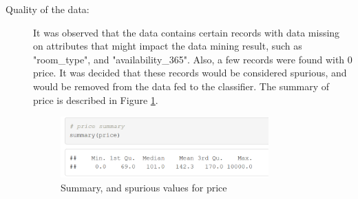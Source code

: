 \documentclass{sig-alternate}
\begin{document}
\begin{description}
\begin{figure}[ht]
		\end{figure}
		\item[Quality of the data:] It was observed that the data contains certain records with data missing on attributes that might impact the data mining result, such as "room\_type", and "availability\_365". Also, a few records were found with 0 price. It was decided that these records would be considered spurious, and would be removed from the data fed to the classifier. The summary of price is described in Figure \ref{price_summary}.
		\begin{figure}[ht]
			\includegraphics[width=8cm]{price_summary.png}
			\centering
			\caption{Summary, and spurious values for price}
			\label{price_summary}
		\end{figure}
	\end{description}
	
\end{document}
